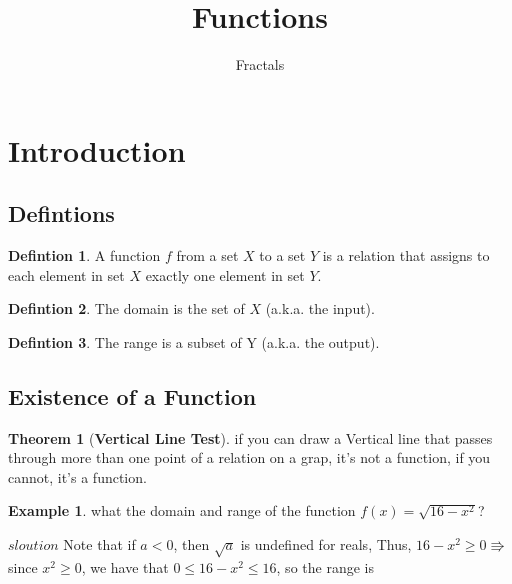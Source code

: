 \documentclass[a4paper]{article}
\theoremstyle{definition}
\newtheorem{definition}{Defintion}[section]
\newtheorem{exmp}{Example}[section]
\newtheorem{theorem}{Theorem}
\begin{document}
\author{Fractals}
\title{\textbf{Functions}}
\maketitle
\tableofcontents
\noindent
\section{Introduction}
\subsection{Defintions}

\begin{definition}
    A function \(f\) from a set \(X\) to a set \(Y\) is a relation that assigns to each element in
    set \(X\) exactly one element in set \(Y\).
\end{definition}

\begin{definition}
    The domain is the set of \(X\) (a.k.a. the input).
\end{definition}

\begin{definition}
    The range is a subset of Y (a.k.a. the output).
\end{definition}

\subsection{Existence of a Function}
\begin{theorem}[\textbf{Vertical Line Test}]
    if you can draw a Vertical line that passes through more than one point of a
    relation on a grap, it's not a function, if you cannot, it's a function.

\end{theorem}


\begin{exmp}
    what the domain and range of the function \(f(x) = \sqrt{16 - x^2}\)?
\end{exmp}

\(sloution\) Note that if \(a < 0 \), then \( \sqrt{a}\) is undefined for reals,
Thus, \(16 - x^2 \ge 0 \Rrightarrow \)  since \(x^2 \ge 0\), we have that \(0 \le 16 - x^2 \le 16\),
so the range is 
\end{document}
